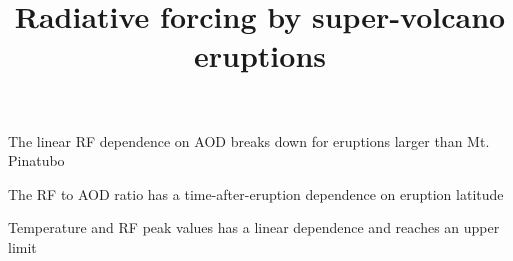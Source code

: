 \documentclass[draft]{agujournal2019}
\begin{document}
   


  \title{Radiative forcing by super-volcano eruptions}





  \begin{keypoints}
    \item
    The linear RF dependence on AOD breaks down for eruptions larger than Mt. Pinatubo
    \item
    The RF to AOD ratio has a time-after-eruption dependence on eruption latitude
    \item
    Temperature and RF peak values has a linear dependence and reaches an upper limit
  \end{keypoints}
\end{document}
